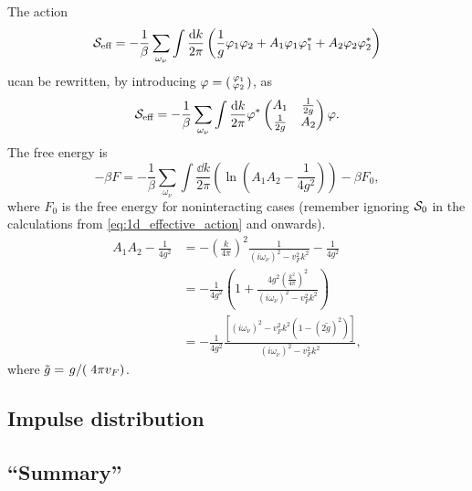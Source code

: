 The action
\begin{equation}
	\mathcal{S}_{\text{eff}} = -\frac1\beta\sum_{\omega_\nu}\int\frac{\dd k}{2\pi}\left(\frac1g\varphi_1\varphi_2+A_1\varphi_1\varphi_1^*+A_2\varphi_2\varphi_2^*\right)
\end{equation}
ucan be rewritten, by introducing \(\varphi = \begin{psmallmatrix}
\varphi_1 \\ \varphi_2 
\end{psmallmatrix}\), as
\begin{equation}
\mathcal{S}_{\text{eff}} = -\frac1\beta\sum_{\omega_\nu}\int\frac{\dd k}{2\pi}\varphi^*\begin{pmatrix}
A_1 & \frac{1}{2g} \\
\frac{1}{2g} & A_2
\end{pmatrix}\varphi.
\end{equation}
The free energy is
\begin{equation}
-\beta F = -\frac1\beta\sum_{\omega_\nu}\int\frac{\dd k}{2\pi}\left(\ln(A_1A_2-\frac{1}{4g^2})\right) - \beta F_0,
\end{equation}
where \(F_0\) is the free energy for noninteracting cases (remember ignoring  \(\mathcal{S}_0\) in the calculations from \cref{eq:1d_effective_action} and onwards).
\begin{align*}
A_1A_2 -\frac{1}{4g^2} &= -\left(\frac{k}{4\pi}\right)^2\frac{1}{(i\omega_\nu)^2-v_F^2k^2} - \frac{1}{4g^2} \\
&= -\frac{1}{4g^2}\left(1+\frac{4g^2\left(\frac{k^2}{4\pi}\right)^2}{(i\omega_\nu)^2-v_F^2k^2}\right) \\
&=-\frac{1}{4g^2}\frac{\left[(i\omega_\nu)^2 - v_F^2k^2(1-(2\tilde{g})^2)\right]}{(i\omega_\nu)^2-v_F^2k^2},
\end{align*}
where \(\tilde{g} = \flatfrac{g}(4\pi v_F)\). 


\subsection{Impulse distribution} %
\subsection{``Summary''} %

